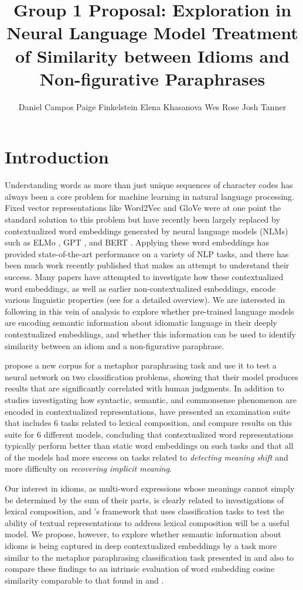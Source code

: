 \documentclass[11pt,a4paper]{article}
\title{Group 1 Proposal: Exploration in  Neural Language Model Treatment of Similarity between Idioms and Non-figurative Paraphrases}
\author{Daniel Campos \And
  Paige Finkelstein \And 
    Elena Khasanova  \And
  Wes Rose  \And
  Josh Tanner }
\begin{document}
\maketitle
\section{Introduction}
Understanding words as more than just unique sequences of character codes has always been a core problem for machine learning in natural language processing. Fixed vector representations like Word2Vec \cite{mikolov2013distributed} and GloVe \cite{Pennington2014GloveGV} were at one point the standard solution to this problem but have recently been largely replaced by contextualized word embeddings generated by neural language models (NLMs) such as  ELMo \cite{Peters2018DeepCW}, GPT \cite{Radford2018ImprovingLU}, and BERT \cite{devlin2018bert}. Applying these word embeddings has provided state-of-the-art performance on a variety of NLP tasks, and there has been much work recently published that makes an attempt to understand their success. Many papers have attempted to investigate how these contextualized word embeddings, as well as earlier non-contextualized embeddings, encode various linguistic properties (see \citet{Belinkov_2019} for a detailed overview). We are interested in following in this vein of analysis to explore whether pre-trained language models are encoding semantic information about idiomatic language in their deeply contextualized embeddings, and whether this information can be used to identify similarity between an idiom and a non-figurative paraphrase. 

\citet{bizzoni-lappin-2018-predicting} propose a new corpus for a metaphor paraphrasing task and use it to test a neural network on two classification problems, showing that their model produces results that are significantly correlated with human judgments. In addition to studies investigating how syntactic, semantic, and commonsense \citep{zhou2019evaluating} phenomenon are encoded in contextualized representations, \citet{shwartz2019pain} have presented an examination suite that includes 6 tasks related to lexical composition, and compare results on this suite for 6 different models, concluding that contextualized word representations typically perform better than static word embeddings on such tasks and that all of the models had more success on tasks related to \textit{detecting meaning shift} and more difficulty on \textit{recovering implicit meaning}.

Our interest in idioms, as multi-word expressions whose meanings cannot simply be determined by the sum of their parts, is clearly related to investigations of lexical composition, and \citet{shwartz2019pain}'s framework that uses classification tasks to test the ability of textual representations to address lexical composition will be a useful model. We propose, however, to explore whether semantic information about idioms is being captured in deep contextualized embeddings by a task more similar to the metaphor paraphrasing classification task presented in \citet{bizzoni-lappin-2018-predicting} and also to compare these findings to an intrinsic evaluation of word embedding cosine similarity comparable to that found in \citet{Wang_2019} and \citet{van_Aken_2019}.
\end{document}
